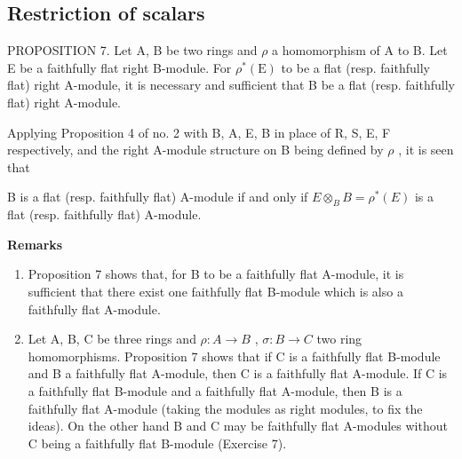 \subsection{Restriction of scalars}

PROPOSITION 7. Let A, B be two rings and \(\rho\) a homomorphism of A to B. Let E be a faithfully flat right B-module. For \(\rho^{*}(\mathrm{E})\) to be a flat (resp. faithfully flat) right A-module, it is necessary and sufficient that B be a flat (resp. faithfully flat) right A-module.

Applying Proposition 4 of no. 2 with B, A, E, B in place of R, S, E, F respectively, and the right A-module structure on B being defined by \(\rho\) , it is seen that

B is a flat (resp. faithfully flat) A-module if and only if \(E \otimes_{B} B = \rho^{*}(E)\) is a flat (resp. faithfully flat) A-module.

\textbf{Remarks}\par

\begin{enumerate}
\def\labelenumi{(\arabic{enumi})}
\item
  Proposition 7 shows that, for B to be a faithfully flat A-module, it is sufficient that there exist one faithfully flat B-module which is also a faithfully flat A-module.
\item
  Let A, B, C be three rings and \(\rho: A \rightarrow B\) , \(\sigma: B \rightarrow C\) two ring homomorphisms. Proposition 7 shows that if C is a faithfully flat B-module and B a faithfully flat A-module, then C is a faithfully flat A-module. If C is a faithfully flat B-module and a faithfully flat A-module, then B is a faithfully flat A-module (taking the modules as right modules, to fix the ideas). On the other hand B and C may be faithfully flat A-modules without C being a faithfully flat B-module (Exercise 7).
\end{enumerate}

